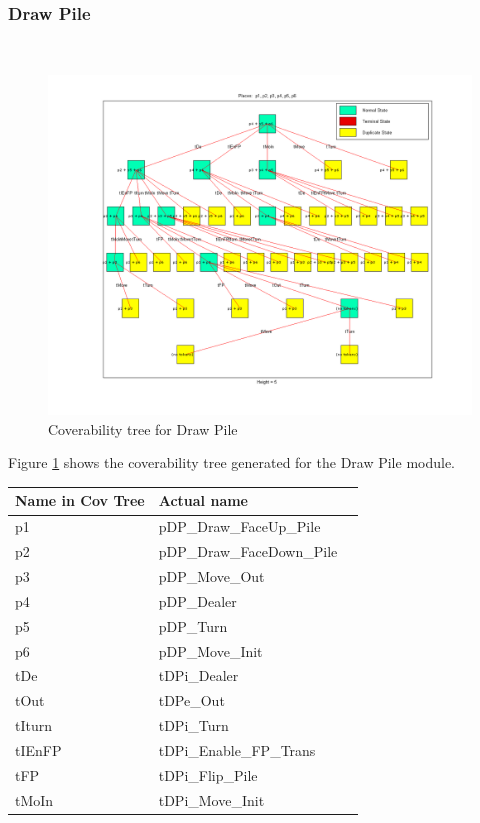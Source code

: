 \documentclass[runningheads,a4paper]{llncs}
\begin{document}
\subsubsection{Draw Pile}~\\
\begin{center}
	\begin{figure}
		\includegraphics[trim=150 80 150 150,scale=0.5]{images/drawPile_CovTree}
		\caption{Coverability tree for Draw Pile}
		\label{fig:cov_tree_draw_pile}
	\end{figure}
\end{center}
Figure \ref{fig:cov_tree_draw_pile} shows the coverability tree generated for the Draw Pile module. 
\begin{center}
	\begin{tabular}{ | l | l | l | }
		\hline
		Name in Cov Tree & Actual name \\ \hline
		p1 & pDP\_Draw\_FaceUp\_Pile  \\ \hline
		p2 & pDP\_Draw\_FaceDown\_Pile \\ \hline
		p3 & pDP\_Move\_Out  \\ \hline
		p4 & pDP\_Dealer \\ \hline
		p5 & pDP\_Turn  \\ \hline
		p6 & pDP\_Move\_Init  \\ \hline
		tDe & tDPi\_Dealer  \\ \hline
		tOut & tDPe\_Out  \\ \hline
		tIturn & tDPi\_Turn  \\ \hline
		tIEnFP & tDPi\_Enable\_FP\_Trans  \\ \hline
		tFP & tDPi\_Flip\_Pile  \\ \hline
		tMoIn & tDPi\_Move\_Init  \\ \hline
	\end{tabular}
\end{center}
\clearpage
\end{document}
